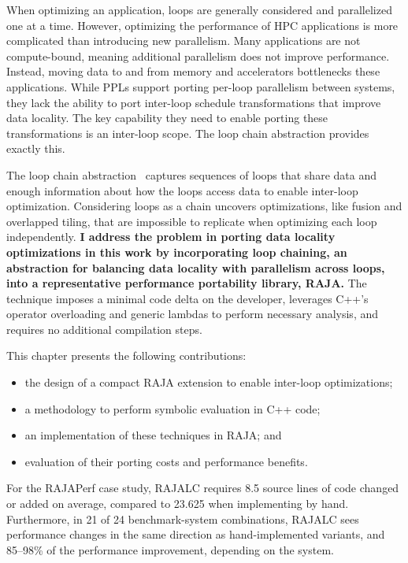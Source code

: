 When optimizing an application, loops are generally considered and
parallelized one at a time.
However, optimizing the performance of HPC applications is more complicated than introducing new parallelism.
Many applications are not compute-bound, meaning additional parallelism does not improve performance. 
Instead, moving data to and from memory and accelerators bottlenecks these applications. 
While PPLs support porting per-loop parallelism between systems, they lack the ability to port inter-loop schedule transformations that improve data locality. 
The key capability they need to enable porting these transformations is an inter-loop scope.
The loop chain abstraction provides exactly this.

The loop chain abstraction~\cite{krieger2013loop} captures sequences of loops that share 
data and enough information about how the loops access 
data to enable inter-loop optimization.
Considering loops as a chain uncovers optimizations, like fusion
and overlapped tiling, that are impossible to replicate when optimizing
each loop independently.
\textbf{I address the problem in porting data locality optimizations in this
work by incorporating loop chaining, an abstraction for balancing data locality
with parallelism across loops, into a representative performance portability library, RAJA.}
The technique imposes a minimal code delta on the developer, leverages C++'s
operator overloading and generic lambdas to perform necessary analysis, and
requires no additional compilation steps.

This chapter presents the following contributions:
\begin{itemize}
\item the design of a compact RAJA extension to enable inter-loop
			optimizations;
\item a methodology to perform symbolic evaluation in C++ code;
\item an implementation of these techniques in RAJA\@; and
\item evaluation of their porting costs and performance benefits.
\end{itemize}

For the RAJAPerf case study, RAJALC requires 8.5 source lines of code changed or added on average, compared to 23.625 when implementing by hand.
Furthermore, in 21 of 24 benchmark-system combinations, RAJALC sees performance changes in the same direction as hand-implemented variants, and 85--98\% of the performance improvement, depending on the system.

